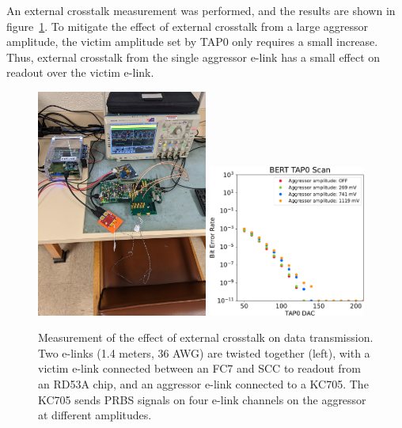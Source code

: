 \documentclass[a4paper,11pt]{article}
\begin{document}

An external crosstalk measurement was performed, and the results are shown in figure~\ref{fig:external_crosstalk}.
To mitigate the effect of external crosstalk from a large aggressor amplitude, the victim amplitude set by TAP0 only requires a small increase.
Thus, external crosstalk from the single aggressor e-link has a small effect on readout over the victim e-link.

\begin{figure}[htbp]
\centering
\includegraphics[width=0.50\textwidth,origin=c,angle=270]{../figures/external_crosstalk_setup.jpg}
\qquad
\includegraphics[width=0.46\textwidth,origin=c]{../figures/BERT_TAP0_Scan_External_Crosstalk-crop.pdf}
\caption{
\label{fig:external_crosstalk}
Measurement of the effect of external crosstalk on data transmission.
Two e-links (1.4 meters, 36 AWG) are twisted together (left), with a victim e-link connected between an FC7 and SCC to readout from an RD53A chip, and an aggressor e-link connected to a KC705.
The KC705 sends PRBS signals on four e-link channels on the aggressor at different amplitudes.
}
\end{figure}
\end{document}
